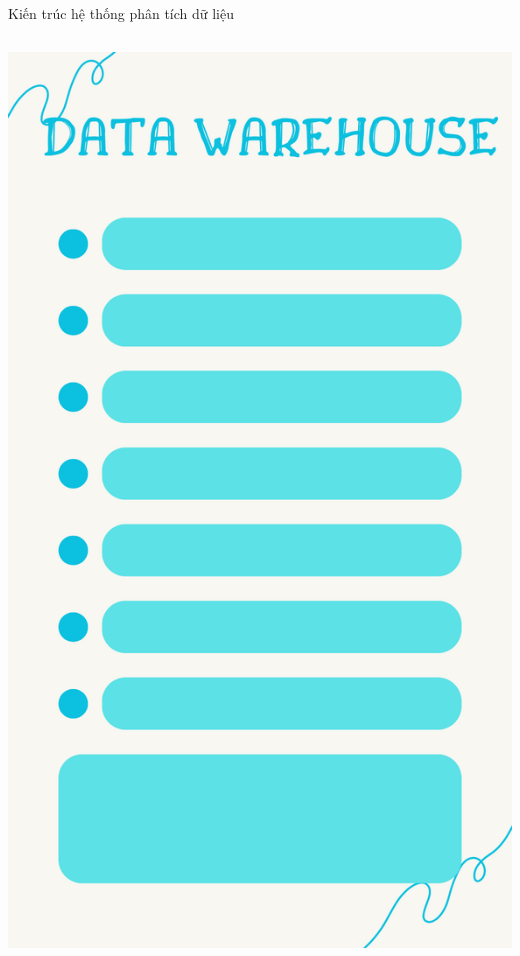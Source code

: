 \documentclass{beamer}
\begin{document}
\begin{frame}{Kiến trúc hệ thống phân tích dữ liệu}
\begin{columns}
\begin{column}{0.24\textwidth}
\includegraphics[width=\textwidth]{pictures/DATA WAREHOUSE.png}
\end{column}


\end{columns}
\end{frame}
\end{document}
